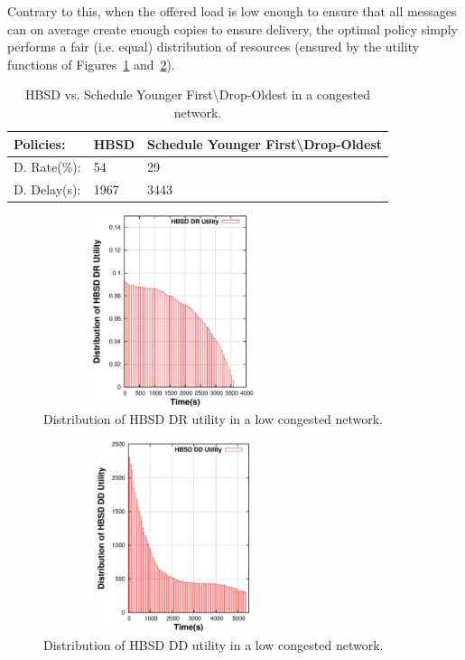 Contrary to this, when the offered load is low enough to ensure that all messages can on average create enough copies to ensure delivery, the optimal policy simply performs a fair (i.e. equal) distribution of resources (ensured by the utility functions of Figures~\ref{HBSD-DR-LCN} and~\ref{HBSD-DD-LCN}).

\begin{table}[!h]
\renewcommand{\arraystretch}{1.1}
\caption{HBSD vs. Schedule Younger First\textbackslash Drop-Oldest in a congested network.}
\centering
\footnotesize
\begin{tabular}{|p{1.8cm}||p{2cm}||p{6cm}|}
\hline
\bfseries Policies: & HBSD & Schedule Younger First\textbackslash Drop-Oldest\\
\hline\hline
D. Rate(\%):&54&29\\
\hline\hline
D. Delay(s):&1967&3443\\
\hline
\end{tabular}
\label{DO-HBSD-C}
\end{table}

\begin{figure}[!h]
  \begin{center}
    \includegraphics[width=3in,height=2.2in]{Chapitre3/fig17.eps}
  \end{center}
  \caption{Distribution of HBSD DR utility in a low congested network.}
  \label{HBSD-DR-LCN}
\end{figure}

\begin{figure}[!h]
  \begin{center}
    \includegraphics[width=3in,height=2.2in]{Chapitre3/fig15.eps}
  \end{center}
  \caption{Distribution of HBSD DD utility in a low congested network.}
  \label{HBSD-DD-LCN}
\end{figure}


